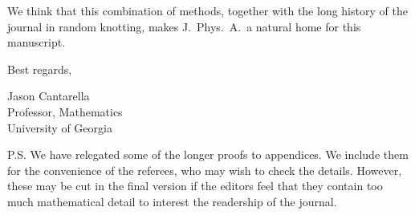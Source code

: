 \documentclass[12pt]{article}
\begin{document}
We think that this combination of methods, together with the long history of the journal in random knotting, makes J.\ Phys.\ A.\ a natural home for this manuscript. 

\bigskip\bigskip

\qquad\qquad Best regards,

\vspace{-.1in}


\vspace{-.1in}

\qquad\qquad \begin{minipage}{4in}
Jason Cantarella\\
Professor, Mathematics\\
University of Georgia
\end{minipage}

P.S. We have relegated some of the longer proofs to appendices. We include them for the convenience of the referees, who may wish to check the details. However, these may be cut in the final version if the editors feel that they contain too much mathematical detail to interest the readership of the journal. 

\end{document}
